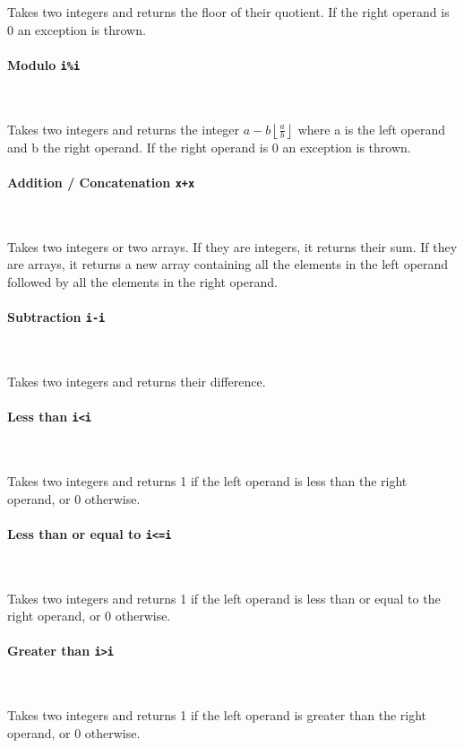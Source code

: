 Takes two integers and returns the floor of their quotient. If the right operand is 0 an exception is thrown.

\paragraph{Modulo \quad \texttt{i\%i}} \

Takes two integers and returns the integer $ a - b \left\lfloor \frac{a}{b} \right\rfloor $ where a is the left operand and b the right operand. If the right operand is 0 an exception is thrown.

\paragraph{Addition / Concatenation \quad \texttt{x+x}} \

Takes two integers or two arrays. If they are integers, it returns their sum. If they are arrays, it returns a new array containing all the elements in the left operand followed by all the elements in the right operand.

\paragraph{Subtraction \quad \texttt{i-i}} \

Takes two integers and returns their difference.

\paragraph{Less than \quad \texttt{i<i}} \

Takes two integers and returns 1 if the left operand is less than the right operand, or 0 otherwise.

\paragraph{Less than or equal to \quad \texttt{i<=i}} \

Takes two integers and returns 1 if the left operand is less than or equal to the right operand, or 0 otherwise.

\paragraph{Greater than \quad \texttt{i>i}} \

Takes two integers and returns 1 if the left operand is greater than the right operand, or 0 otherwise.

